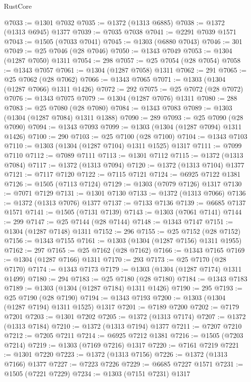 \begin{lexlean}{RustCore}
\begin{coremodule}
@7033 := @1301 @7032
@7035 := @1372 (@1313 @6885)
@7038 := @1372 (@1313 @6945) @1377
@7039 := @7035 @7038
@7041 := @2291 @7039 @1571
@7043 := @1505 (@7033 @7041)
@7045 := @1303 (@6880 @7043)
@7046 := 301
@7049 := @25 @7046 (@28 @7046)
@7050 := @1343 @7049
@7053 := @1304 (@1287 @7050) @1311
@7054 := 298
@7057 := @25 @7054 (@28 @7054)
@7058 := @1343 @7057
@7061 := @1304 (@1287 @7058) @1311
@7062 := 291
@7065 := @25 @7062 (@28 @7062)
@7066 := @1343 @7065
@7071 := @1303 (@1304 (@1287 @7066) @1311 @1426)
@7072 := 292
@7075 := @25 @7072 (@28 @7072)
@7076 := @1343 @7075
@7079 := @1304 (@1287 @7076) @1311
@7080 := 288
@7083 := @25 @7080 (@28 @7080)
@7084 := @1343 @7083
@7089 := @1303 (@1304 (@1287 @7084) @1311 @1388)
@7090 := 289
@7093 := @25 @7090 (@28 @7090)
@7094 := @1343 @7093
@7099 := @1303 (@1304 (@1287 @7094) @1311 @1426)
@7100 := 290
@7103 := @25 @7100 (@28 @7100)
@7104 := @1343 @7103
@7110 := @1303 (@1304 (@1287 @7104) @1311 @1525) @1317
@7111 := @7099 @7110
@7112 := @7089 @7111
@7113 := @1301 @7112
@7115 := @1372 (@1313 @7084)
@7117 := @1372 (@1313 @7094)
@7120 := @1372 (@1313 @7104) @1377
@7121 := @7117 @7120
@7122 := @7115 @7121
@7124 := @6925 @7122 @1381
@7126 := @1505 (@7113 @7124)
@7129 := @1303 (@7079 @7126) @1317
@7130 := @7071 @7129
@7131 := @1301 @7130
@7133 := @1372 (@1313 @7066)
@7136 := @1372 (@1313 @7076) @1377
@7137 := @7133 @7136
@7139 := @6685 @7137 @1571
@7141 := @1505 (@7131 @7139)
@7143 := @1303 (@7061 @7141)
@7144 := 299
@7147 := @25 @7144 (@28 @7144)
@7148 := @1343 @7147
@7151 := @1304 (@1287 @7148) @1311
@7152 := 296
@7155 := @25 @7152 (@28 @7152)
@7156 := @1343 @7155
@7161 := @1303 (@1304 (@1287 @7156) @1311 @1955)
@7162 := 297
@7165 := @25 @7162 (@28 @7162)
@7166 := @1343 @7165
@7169 := @1304 (@1287 @7166) @1311
@7170 := 293
@7173 := @25 @7170 (@28 @7170)
@7174 := @1343 @7173
@7179 := @1303 (@1304 (@1287 @7174) @1311 @1499)
@7180 := 294
@7183 := @25 @7180 (@28 @7180)
@7184 := @1343 @7183
@7189 := @1303 (@1304 (@1287 @7184) @1311 @1426)
@7190 := 295
@7193 := @25 @7190 (@28 @7190)
@7194 := @1343 @7193
@7200 := @1303 (@1304 (@1287 @7194) @1311 @1525) @1317
@7201 := @7189 @7200
@7202 := @7179 @7201
@7203 := @1301 @7202
@7205 := @1372 (@1313 @7174)
@7207 := @1372 (@1313 @7184)
@7210 := @1372 (@1313 @7194) @1377
@7211 := @7207 @7210
@7212 := @7205 @7211
@7214 := @6925 @7212 @1381
@7216 := @1505 (@7203 @7214)
@7219 := @1303 (@7169 @7216) @1317
@7220 := @7161 @7219
@7221 := @1301 @7220
@7223 := @1372 (@1313 @7156)
@7226 := @1372 (@1313 @7166) @1377
@7227 := @7223 @7226
@7229 := @6685 @7227 @1571
@7231 := @1505 (@7221 @7229)
@7234 := @1303 (@7151 @7231) @1317

\end{coremodule}
\end{lexlean}
